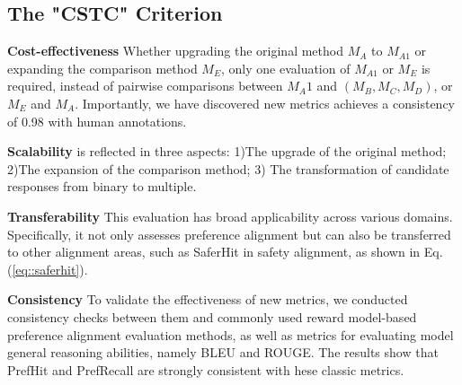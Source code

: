 \subsection{The "CSTC" Criterion}
\label{sec::cstc}

\noindent\textbf{Cost-effectiveness}
Whether upgrading the original method \( M_A \) to \( M_{A1} \) or expanding the comparison method \( M_E \), only one evaluation of \( M_{A1} \) or \( M_E \) is required, instead of pairwise comparisons between \( M_A1 \) and \( (M_B, M_C, M_D) \), or \( M_E \) and \( M_A \). Importantly, we have discovered new metrics achieves a consistency of 0.98 with human annotations.

\noindent\textbf{Scalability} is reflected in three aspects: 1)The upgrade of the original method; 2)The expansion of the comparison method; 3) The transformation of candidate responses from binary to multiple.

\noindent\textbf{Transferability}
This evaluation has broad applicability across various domains. Specifically, it not only assesses preference alignment but can also be transferred to other alignment areas, such as SaferHit in safety alignment, as shown in Eq.(\ref{eq::saferhit}).

\noindent\textbf{Consistency}
To validate the effectiveness of new metrics, we conducted consistency checks between them and commonly used reward model-based preference alignment evaluation methods, as well as metrics for evaluating model general reasoning abilities, namely BLEU and ROUGE.
The results show that PrefHit and PrefRecall are strongly consistent with hese classic metrics.

  
